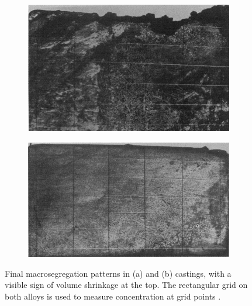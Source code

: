 %
\begin{figure}[htbp]
\centering
  \begin{subfigure}[t]{0.45\textwidth}
    \centering
	\includegraphics[width=\textwidth]{Chapter5/Graphics/2d/HH1.png}
	\caption{}
    \label{fig:HH1}
  \end{subfigure}
  \begin{subfigure}[t]{0.45\textwidth}
    \centering
	\includegraphics[width=\textwidth]{Chapter5/Graphics/2d/HH2.png}
	\caption{}
    \label{fig:HH2}
  \end{subfigure}
\caption{Final macrosegregation patterns in (a)  and (b)  castings, with a visible sign of volume shrinkage at the top. 
		The rectangular grid on both alloys is used to measure concentration at grid points \citep{hebditch_observations_1974}.} 
\label{fig:HH_exp}
\end{figure}


